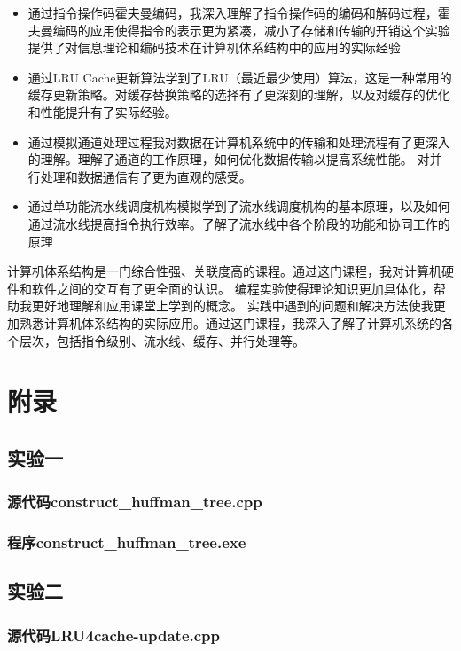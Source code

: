 \documentclass[UTF8,12pt]{article}
\begin{document}
\begin{itemize}
    \item 通过指令操作码霍夫曼编码，我深入理解了指令操作码的编码和解码过程，霍夫曼编码的应用使得指令的表示更为紧凑，减小了存储和传输的开销这个实验提供了对信息理论和编码技术在计算机体系结构中的应用的实际经验
    \item 通过LRU Cache更新算法学到了LRU（最近最少使用）算法，这是一种常用的缓存更新策略。对缓存替换策略的选择有了更深刻的理解，以及对缓存的优化和性能提升有了实际经验。
    \item 通过模拟通道处理过程我对数据在计算机系统中的传输和处理流程有了更深入的理解。理解了通道的工作原理，如何优化数据传输以提高系统性能。
    对并行处理和数据通信有了更为直观的感受。
    \item 通过单功能流水线调度机构模拟学到了流水线调度机构的基本原理，以及如何通过流水线提高指令执行效率。了解了流水线中各个阶段的功能和协同工作的原理    
\end{itemize}

计算机体系结构是一门综合性强、关联度高的课程。通过这门课程，我对计算机硬件和软件之间的交互有了更全面的认识。
编程实验使得理论知识更加具体化，帮助我更好地理解和应用课堂上学到的概念。
实践中遇到的问题和解决方法使我更加熟悉计算机体系结构的实际应用。通过这门课程，我深入了解了计算机系统的各个层次，包括指令级别、流水线、缓存、并行处理等。




\newpage

\section{附录}
\subsection{实验一}
\subsubsection{源代码construct\_huffman\_tree.cpp}
\subsubsection{程序construct\_huffman\_tree.exe}
\subsection{实验二}
\subsubsection{源代码LRU4cache-update.cpp}
\end{document}
